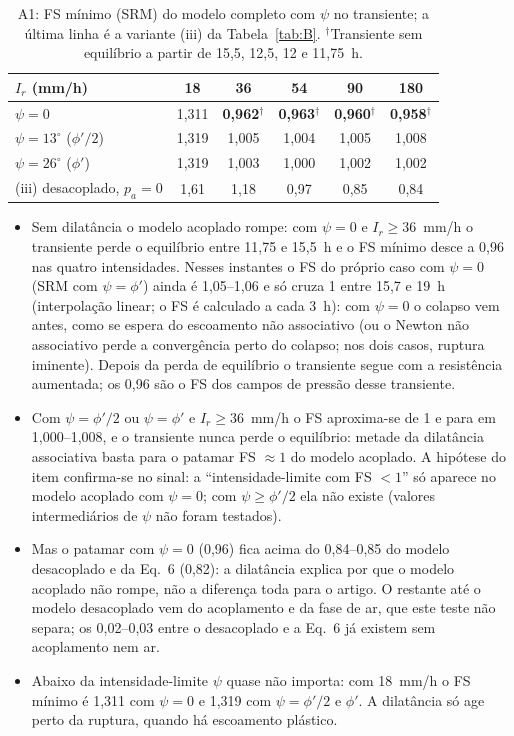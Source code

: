 \begin{table}[h!]
\centering\small
\caption{A1: FS m\'inimo (SRM) do modelo completo com $\psi$ no transiente; a \'ultima linha \'e a variante (iii)
da Tabela~\ref{tab:B}. $^\dagger$Transiente sem equil\'ibrio a partir de 15,5, 12,5, 12 e 11,75~h.}\label{tab:A1}
\begin{tabular}{lccccc}
\toprule
$I_r$ (mm/h) & 18 & 36 & 54 & 90 & 180\\
\midrule
$\psi=0$ & 1,311 & \textbf{0,962}$^\dagger$ & \textbf{0,963}$^\dagger$ & \textbf{0,960}$^\dagger$ &
\textbf{0,958}$^\dagger$\\
$\psi=13^\circ$ ($\phi'/2$) & 1,319 & 1,005 & 1,004 & 1,005 & 1,008\\
$\psi=26^\circ$ ($\phi'$) & 1,319 & 1,003 & 1,000 & 1,002 & 1,002\\
\midrule
(iii) desacoplado, $p_a=0$ & 1,61 & 1,18 & 0,97 & 0,85 & 0,84\\
\bottomrule
\end{tabular}
\end{table}

\begin{itemize}
\item Sem dilat\^ancia o modelo acoplado rompe: com $\psi=0$ e $I_r\ge36$~mm/h o transiente perde o equil\'ibrio
entre 11,75 e 15,5~h e o FS m\'inimo desce a 0,96 nas quatro intensidades. Nesses instantes o FS do pr\'oprio caso com
$\psi=0$ (SRM com $\psi=\phi'$) ainda \'e 1,05--1,06 e s\'o cruza 1 entre 15,7 e 19~h (interpola\c{c}\~ao linear; o
FS \'e calculado a cada 3~h): com $\psi=0$ o colapso vem antes,
como se espera do escoamento n\~ao associativo (ou o Newton n\~ao associativo perde a converg\^encia perto do colapso;
nos dois casos, ruptura iminente). Depois da perda de equil\'ibrio o transiente segue com a resist\^encia aumentada;
os 0,96 s\~ao o FS dos campos de press\~ao desse transiente.
\item Com $\psi=\phi'/2$ ou $\psi=\phi'$ e $I_r\ge36$~mm/h o FS aproxima-se de 1 e para em 1,000--1,008, e o
transiente nunca perde o equil\'ibrio: metade da dilat\^ancia associativa basta para o patamar FS $\approx1$ do modelo
acoplado. A hip\'otese do item confirma-se no sinal: a ``intensidade-limite com FS $<1$'' s\'o aparece no modelo
acoplado com $\psi=0$; com $\psi\ge\phi'/2$ ela n\~ao existe (valores intermedi\'arios de $\psi$ n\~ao foram testados).
\item Mas o patamar com $\psi=0$ (0,96) fica acima do 0,84--0,85 do modelo desacoplado e da Eq.~6 (0,82): a
dilat\^ancia explica por que o modelo acoplado n\~ao rompe, n\~ao a diferen\c{c}a toda para o artigo. O restante at\'e
o modelo desacoplado vem do acoplamento e da fase de ar, que este teste n\~ao separa; os 0,02--0,03 entre o
desacoplado e a Eq.~6 j\'a existem sem acoplamento nem ar.
\item Abaixo da intensidade-limite $\psi$ quase n\~ao importa: com 18~mm/h o FS m\'inimo \'e 1,311 com $\psi=0$ e
1,319 com $\psi=\phi'/2$ e $\phi'$. A dilat\^ancia s\'o age perto da ruptura, quando h\'a escoamento pl\'astico.
\end{itemize}

